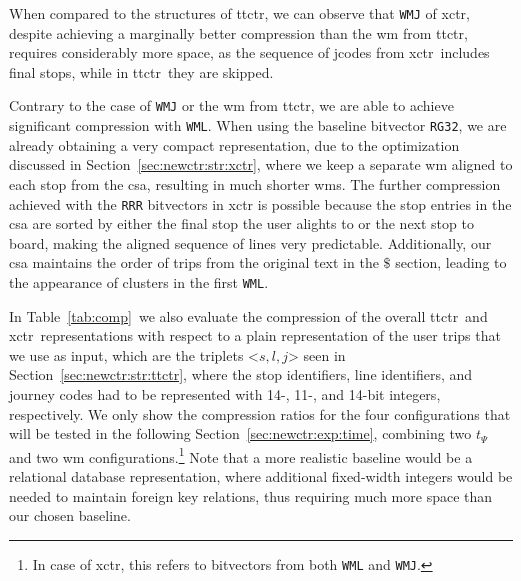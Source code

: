     When compared to the structures of \gls{ttctr}, we can observe that \texttt{WMJ} of \gls{xctr}, despite achieving a marginally better compression than the \gls{wm} from \gls{ttctr}, requires considerably more space, as the sequence of jcodes from \gls{xctr}~includes final stops, while in \gls{ttctr}~they are skipped.
    
    Contrary to the case of \texttt{WMJ} or the \gls{wm} from \gls{ttctr}, we are able to achieve significant compression with \texttt{WML}. When using the baseline bitvector \texttt{RG32}, we are already obtaining a very compact representation, due to the optimization discussed in Section~\ref{sec:newctr:str:xctr}, where we keep a separate \gls{wm} aligned to each stop from the \gls{csa}, resulting in much shorter \gls{wm}s. The further compression achieved with the \texttt{RRR} bitvectors in \gls{xctr} is possible because the stop entries in the \gls{csa} are sorted by either the final stop the user alights to or the next stop to board, making the aligned sequence of lines very predictable. Additionally, our \gls{csa} maintains the order of trips from the original text in the $\$$ section, leading to the appearance of clusters in the first \texttt{WML}.
    
    In Table~\ref{tab:comp}~we also evaluate the compression of the overall \gls{ttctr}~and \gls{xctr}~representations with respect to a plain representation of the user trips that we use as input, which are the triplets <$s,l,j$> seen in Section~\ref{sec:newctr:str:ttctr}, where the stop identifiers, line identifiers, and journey codes had to be represented with 14-, 11-, and 14-bit integers, respectively. We only show the compression ratios for the four configurations that will be tested in the following Section~\ref{sec:newctr:exp:time}, combining two $t_{\Psi}$ and two \gls{wm} configurations.\footnote{In case of \gls{xctr}, this refers to bitvectors from both \texttt{WML} and \texttt{WMJ}.} Note that a more realistic baseline would be a relational database representation, where additional fixed-width integers would be needed to maintain foreign key relations, thus requiring much more space than our chosen baseline.
    
